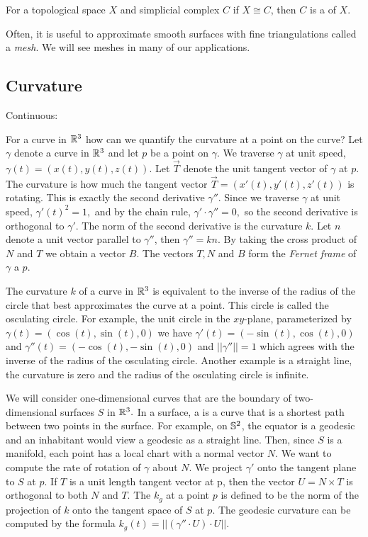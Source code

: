 \begin{definition}[Triangulation]
For a topological space $X$ and simplicial complex $C$ if $X\cong C$,
then $C$  is a  of $X$.
\end{definition}

Often, it is useful to approximate smooth surfaces with fine triangulations called
a \emph{mesh}. We will see meshes in many of our applications.

\subsection{Curvature}

Continuous:

For a curve in $\mathbb{R}^3$ how can we quantify the curvature at a point on the curve?
Let $\gamma$ denote a curve in $\mathbb{R}^3$ and let $p$ be a point on $\gamma$.
We traverse $\gamma$ at unit speed, $\gamma(t)=(x(t),y(t),z(t))$.  
Let $\vec{T}$ denote the unit tangent vector of $\gamma$ at $p$. 
The curvature is how much the tangent vector $\vec{T}=(x'(t),y'(t),z'(t))$ is rotating. 
This is exactly the second derivative $\gamma''$. Since we traverse $\gamma$
at unit speed, $\gamma'(t)^2=1,$ and by the chain rule, $\gamma'\cdot \gamma''=0,$
so  the second derivative is orthogonal to $\gamma'$. The norm of the second
derivative is the curvature $k$.
Let $n$ denote a unit vector parallel to $\gamma''$, then $\gamma''=k n$.
By taking the cross product of $N$ and $T$ we obtain a vector $B$.
The vectors $T,N$ and $B$ form the \emph{Fernet frame} of $\gamma$ a $p.$


The curvature $k$ of a curve in $\mathbb{R}^3$ is equivalent to the inverse of the radius
of the circle that best approximates the curve at a point. This circle is called
the osculating circle. 
For example, the unit circle in the $xy$-plane, parameterized by $\gamma(t)=(\cos(t),\sin(t),0)$
we have $\gamma'(t)=(-\sin(t),\cos(t),0)$ and $\gamma''(t)=(-\cos(t),-\sin(t),0)$ and $||\gamma''||=1$
which agrees with the inverse of the radius of the osculating circle.
Another example is a straight line,
the curvature is zero and the radius of the osculating circle is infinite.

We will consider one-dimensional curves that are the boundary of two-dimensional
surfaces $S$ in $\mathbb{R}^3.$ In a surface, a  is a curve that is a shortest path
between two points in the surface. For example, on $\mathbb{S}^2$, the equator is a geodesic
and an inhabitant would view a geodesic as a straight line. 
Then, since $S$ is a manifold, each point has a local chart with a normal vector $N$.
We want to compute the rate of rotation of $\gamma$ about $N$.
We project $\gamma'$ onto the tangent plane to $S$ at $p$.
If $T$ is a unit length tangent vector at p, then the vector $U=N\times T$
is orthogonal to both $N$ and $T$.
The  $k_g$ at a point $p$ is defined to be the norm of the projection
of $k$ onto the tangent space of $S$ at $p$. The geodesic curvature can be computed
by the formula $k_g(t)=||(\gamma''\cdot U)\cdot U||.$

